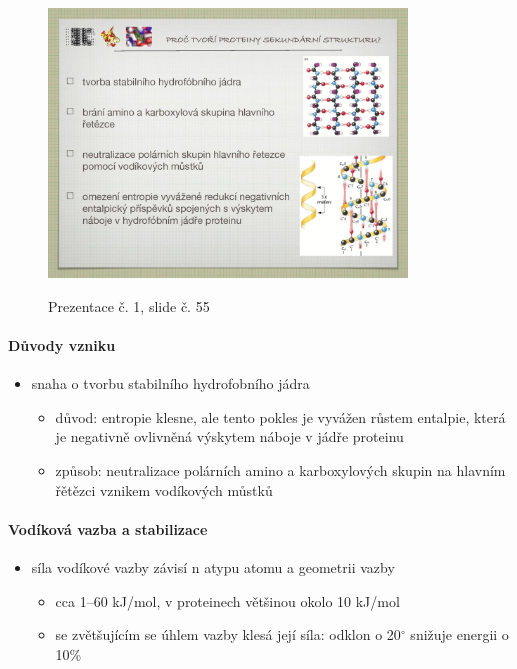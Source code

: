 \documentclass[DIV=8]{scrreprt}
\begin{document}
\begin{figure}
    \caption{Prezentace č. 1, slide č. 55}
    \includegraphics[width=0.85\textwidth]{slides-1/slide-55.jpg}
    \centering
    \label{slides-1-slide-55}
\end{figure}

\paragraph{Důvody vzniku}
\begin{itemize}[nosep]
    \item snaha o tvorbu stabilního hydrofobního jádra
\begin{itemize}[nosep]
    \item důvod: entropie klesne, ale tento pokles je vyvážen růstem entalpie, která je negativně ovlivněná výskytem náboje v jádře proteinu
    \item způsob: neutralizace polárních amino a karboxylových skupin na hlavním řětězci vznikem vodíkových můstků
\end{itemize}

\end{itemize}



\paragraph{Vodíková vazba a stabilizace}
\begin{itemize}[nosep]
    \item síla vodíkové vazby závisí n atypu atomu a geometrii vazby
\begin{itemize}[nosep]
    \item cca 1--60 kJ/mol, v proteinech většinou okolo 10 kJ/mol
    \item se zvětšujícím se úhlem vazby klesá její síla: odklon o 20\(^{\circ}\) snižuje energii o 10\%
\end{itemize}

\end{itemize}
\end{document}
